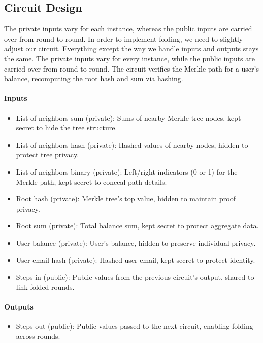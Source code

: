 \subsection{Circuit Design}
The private inputs vary for each instance, whereas the public inputs are carried over from round to round.
In order to implement folding, we need to slightly adjust our \hyperref[subsec:pi]{circuit}. Everything except the way we handle inputs and outputs stays the same.
The private inputs vary for every instance, while the public inputs are carried over from round to round. 
The circuit verifies the Merkle path for a user's balance, recomputing the root hash and sum via hashing.

\paragraph{Inputs}
\begin{itemize}
   \item List of neighbors sum (private): Sums of nearby Merkle tree nodes, kept secret to hide the tree structure.
   \item List of neighbors hash (private): Hashed values of nearby nodes, hidden to protect tree privacy.
   \item List of neighbors binary (private): Left/right indicators (0 or 1) for the Merkle path, kept secret to conceal path details.
   \item Root hash (private): Merkle tree's top value, hidden to maintain proof privacy.
   \item Root sum (private): Total balance sum, kept secret to protect aggregate data.
   \item User balance (private): User's balance, hidden to preserve individual privacy.
   \item User email hash (private): Hashed user email, kept secret to protect identity.
   \item Steps in (public): Public values from the previous circuit's output, shared to link folded rounds.
   \end{itemize}

\paragraph{Outputs}
\begin{itemize}
   \item Steps out (public): Public values passed to the next circuit, enabling folding across rounds.
   \end{itemize}

